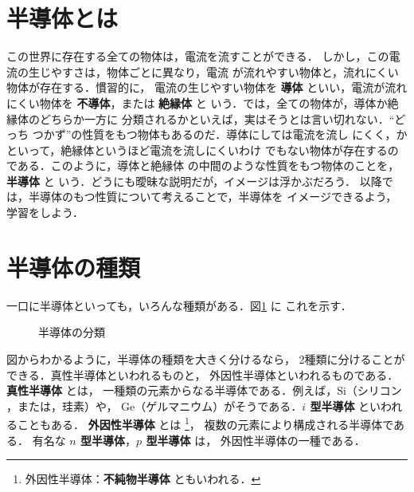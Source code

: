 ﻿%
    \section{半導体とは}
        この世界に存在する全ての物体は，電流を流すことができる．
        しかし，この電流の生じやすさは，物体ごとに異なり，電流
        が流れやすい物体と，流れにくい物体が存在する．慣習的に，
        電流の生じやすい物体を \textbf{導体} といい，電流が流れ
        にくい物体を \textbf{不導体}，または \textbf{絶縁体} と
        いう．では，全ての物体が，導体か絶縁体のどちらか一方に
        分類されるかといえば，実はそうとは言い切れない．“どっち
        つかず”の性質をもつ物体もあるのだ．導体にしては電流を流し
        にくく，かといって，絶縁体というほど電流を流しにくいわけ
        でもない物体が存在するのである．このように，導体と絶縁体
        の中間のような性質をもつ物体のことを，\textbf{半導体} と
        いう．どうにも曖昧な説明だが，イメージは浮かぶだろう．
        以降では，半導体のもつ性質について考えることで，半導体を
        イメージできるよう，学習をしよう．

    \section{半導体の種類}
        一口に半導体といっても，いろんな種類がある．図\ref{fig:handoutai_bunrui} に
        これを示す．
                        \begin{figure}[htbp]
                            \begin{center}
                                \caption{半導体の分類}
                                \label{fig:handoutai_bunrui}
                            \end{center}
                        \end{figure}

        図からわかるように，半導体の種類を大きく分けるなら，
        2種類に分けることができる．真性半導体といわれるものと，
        外因性半導体といわれるものである．\textbf{真性半導体} とは，
        一種類の元素からなる半導体である．例えば，Si（シリコン
        ，または，珪素）や，
        Ge（ゲルマニウム）がそうである．\textbf{$i$ 型半導体} といわれ
        ることもある．
        \textbf{外因性半導体} とは
            \footnote{
                外因性半導体：\textbf{不純物半導体} ともいわれる．
            }，
        複数の元素により構成される半導体である．
        有名な \textbf{$n$ 型半導体}，\textbf{$p$ 型半導体} は，
        外因性半導体の一種である．

